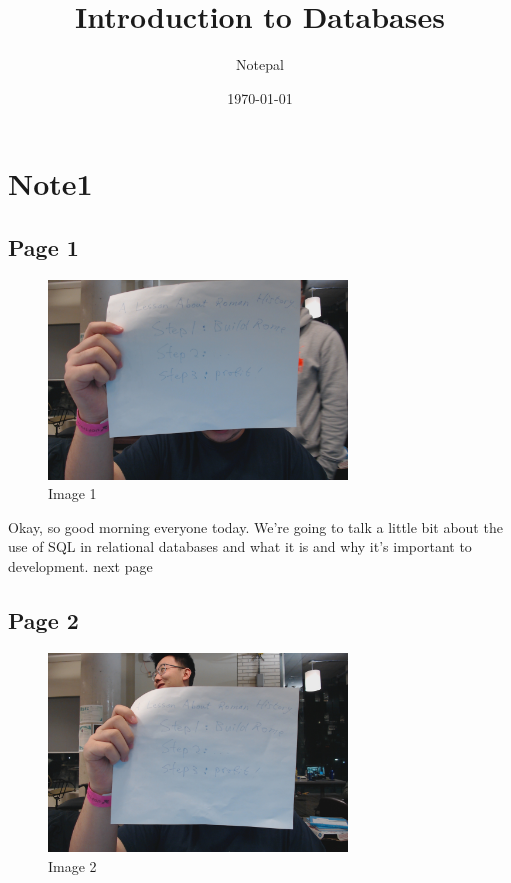 \documentclass{article}%
\title{Introduction to Databases}%
\author{Notepal}%
\date{\today}%
\begin{document}
%
\normalsize%
\maketitle%
\section{Note1}%
\label{sec:Note1}%
\subsection{Page 1}%
\label{subsec:Page 1}%


\begin{figure}[h!]%
\centering%
\includegraphics[width=300px]{../Notes/IntroductiontoDatabases/Note1/image1.jpg}%
\caption{Image 1}%
\end{figure}

%
Okay, so good morning everyone today. We're going to talk a little bit about the use of SQL in relational databases and what it is and why it's important to development. \newline%
 next page \newline%

%
\subsection{Page 2}%
\label{subsec:Page 2}%


\begin{figure}[h!]%
\centering%
\includegraphics[width=300px]{../Notes/IntroductiontoDatabases/Note1/image2.jpg}%
\caption{Image 2}%
\end{figure}
\end{document}
